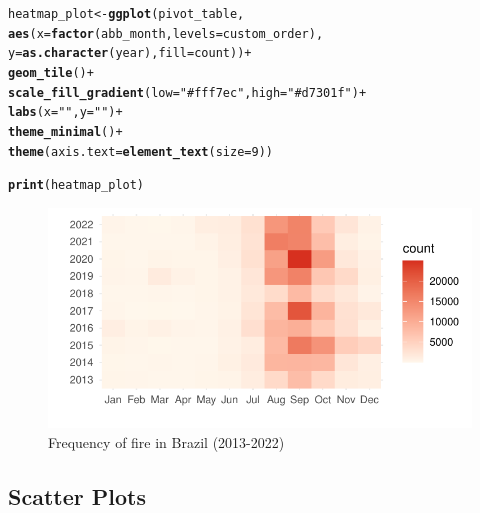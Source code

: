 \documentclass{article}\usepackage[]{graphicx}\usepackage[]{xcolor}
\makeatletter
\def\maxwidth{ %
  \ifdim\Gin@nat@width>\linewidth
    \linewidth
  \else
    \Gin@nat@width
  \fi
}
\newcommand{\hlnum}[1]{\textcolor[rgb]{0.686,0.059,0.569}{#1}}%
\newcommand{\hlstr}[1]{\textcolor[rgb]{0.192,0.494,0.8}{#1}}%
\newcommand{\hlopt}[1]{\textcolor[rgb]{0,0,0}{#1}}%
\newcommand{\hlstd}[1]{\textcolor[rgb]{0.345,0.345,0.345}{#1}}%
\newcommand{\hlkwb}[1]{\textcolor[rgb]{0.69,0.353,0.396}{#1}}%
\newcommand{\hlkwc}[1]{\textcolor[rgb]{0.333,0.667,0.333}{#1}}%
\newcommand{\hlkwd}[1]{\textcolor[rgb]{0.737,0.353,0.396}{\textbf{#1}}}%
\newenvironment{kframe}{%
 \def\at@end@of@kframe{}%
 \ifinner\ifhmode%
  \def\at@end@of@kframe{\end{minipage}}%
  \begin{minipage}{\columnwidth}%
 \fi\fi%
 \def\FrameCommand##1{\hskip\@totalleftmargin \hskip-\fboxsep
 \colorbox{shadecolor}{##1}\hskip-\fboxsep
     \hskip-\linewidth \hskip-\@totalleftmargin \hskip\columnwidth}%
 \MakeFramed {\advance\hsize-\width
   \@totalleftmargin\z@ \linewidth\hsize
   \@setminipage}}%
 {\par\unskip\endMakeFramed%
 \at@end@of@kframe}
\newenvironment{knitrout}{}{} %
\numberwithin{equation}{section}
\makeatother
\begin{document}
\begin{knitrout}\scriptsize
{}\color{fgcolor}\begin{kframe}
\begin{alltt}
\hlstd{heatmap_plot} \hlkwb{<-} \hlkwd{ggplot}\hlstd{(pivot_table,}
                       \hlkwd{aes}\hlstd{(}\hlkwc{x} \hlstd{=} \hlkwd{factor}\hlstd{(abb_month,} \hlkwc{levels} \hlstd{= custom_order),}
                           \hlkwc{y} \hlstd{=} \hlkwd{as.character}\hlstd{(year),} \hlkwc{fill} \hlstd{= count))} \hlopt{+}
  \hlkwd{geom_tile}\hlstd{()} \hlopt{+}
  \hlkwd{scale_fill_gradient}\hlstd{(}\hlkwc{low} \hlstd{=} \hlstr{"#fff7ec"}\hlstd{,} \hlkwc{high} \hlstd{=} \hlstr{"#d7301f"}\hlstd{)} \hlopt{+}
  \hlkwd{labs}\hlstd{(}\hlkwc{x} \hlstd{=} \hlstr{" "}\hlstd{,} \hlkwc{y} \hlstd{=} \hlstr{" "}\hlstd{)} \hlopt{+}
  \hlkwd{theme_minimal}\hlstd{()} \hlopt{+}
  \hlkwd{theme}\hlstd{(}\hlkwc{axis.text} \hlstd{=} \hlkwd{element_text}\hlstd{(}\hlkwc{size} \hlstd{=} \hlnum{9}\hlstd{))}

\hlkwd{print}\hlstd{(heatmap_plot)}
\end{alltt}
\end{kframe}\begin{figure}[H]

{\centering \includegraphics[width=\maxwidth]{figure/beamer-fire-by-months-fy13-22-1} 

}

\caption[Frequency of fire in Brazil (2013-2022)]{Frequency of fire in Brazil (2013-2022)}\label{fig:fire-by-months-fy13-22}
\end{figure}

\end{knitrout}


\subsection{Scatter Plots}
\end{document}
